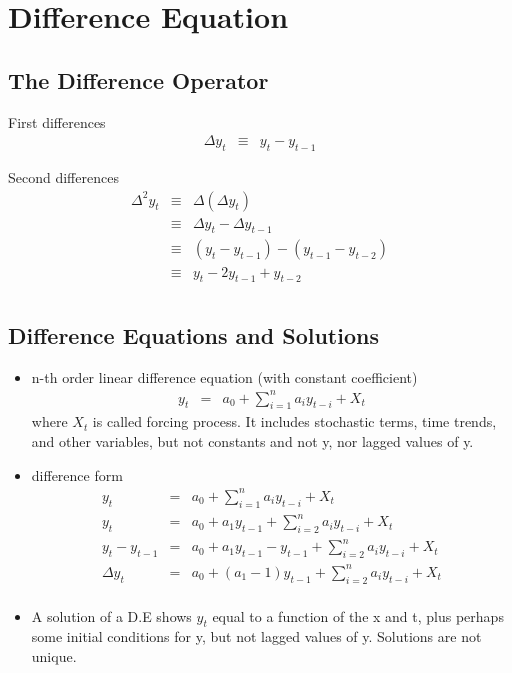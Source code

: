 \section[Difference Equation]{Difference Equation}
\subsection{The Difference Operator}
First differences
\begin{eqnarray*}
\Delta y_{t}&\equiv&y_{t}-y_{t-1}
\end{eqnarray*}

Second differences
\begin{eqnarray*}
\Delta^{2}y_{t}&\equiv&\Delta(\Delta y_{t})\\
			&\equiv&\Delta y_{t}-\Delta y_{t-1}\\
			&\equiv&(y_{t}-y_{t-1})-(y_{t-1}-y_{t-2})\\
			&\equiv&y_{t}-2y_{t-1}+y_{t-2}\\
\end{eqnarray*}

\subsection{Difference Equations and Solutions}
\begin{itemize}
\item n-th order linear difference equation (with constant coefficient)
\begin{eqnarray*}
y_{t}&=&a_{0}+\sum_{i=1}^{n}a_{i}y_{t-i}+X_{t}
\end{eqnarray*}
where $X_{t}$ is called forcing process. It includes stochastic terms, time trends, and other variables, but not constants and not y, nor lagged values of y.

\item difference form
\begin{eqnarray*}
y_{t}&=&a_{0}+\sum_{i=1}^{n}a_{i}y_{t-i}+X_{t}\\
y_{t}&=&a_{0}+a_{1}y_{t-1}+\sum_{i=2}^{n}a_{i}y_{t-i}+X_{t}\\
y_{t}-y_{t-1}&=&a_{0}+a_{1}y_{t-1}-y_{t-1}+\sum_{i=2}^{n}a_{i}y_{t-i}+X_{t}\\
\Delta y_{t}&=&a_{0}+(a_{1}-1)y_{t-1}+\sum_{i=2}^{n}a_{i}y_{t-i}+X_{t}\\
\end{eqnarray*}

\item A solution of a D.E shows $y_{t}$ equal to a function of the x and t, plus perhaps some initial conditions for y, but not lagged values of y. Solutions are not unique.
\end{itemize}

